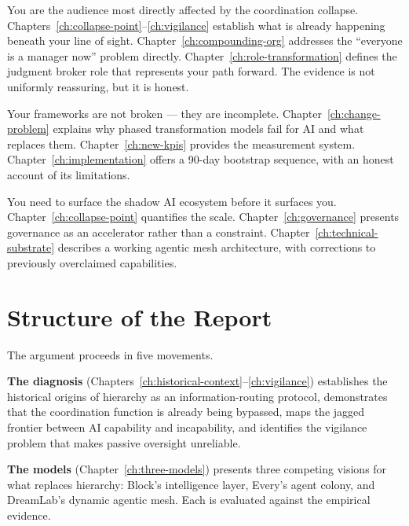 \begin{keyinsight}[title={Who This Report Is For}]
\begin{description}[style=nextline, leftmargin=2em]
  \item[Middle Managers and Team Leaders] You are the audience most directly affected by the coordination collapse. Chapters~\ref{ch:collapse-point}--\ref{ch:vigilance} establish what is already happening beneath your line of sight. Chapter~\ref{ch:compounding-org} addresses the ``everyone is a manager now'' problem directly. Chapter~\ref{ch:role-transformation} defines the judgment broker role that represents your path forward. The evidence is not uniformly reassuring, but it is honest.

  \item[Change Managers and Transformation Leaders] Your frameworks are not broken --- they are incomplete. Chapter~\ref{ch:change-problem} explains why phased transformation models fail for AI and what replaces them. Chapter~\ref{ch:new-kpis} provides the measurement system. Chapter~\ref{ch:implementation} offers a 90-day bootstrap sequence, with an honest account of its limitations.

  \item[AI Strategy Leaders and Chief Technology Officers] You need to surface the shadow AI ecosystem before it surfaces you. Chapter~\ref{ch:collapse-point} quantifies the scale. Chapter~\ref{ch:governance} presents governance as an accelerator rather than a constraint. Chapter~\ref{ch:technical-substrate} describes a working agentic mesh architecture, with corrections to previously overclaimed capabilities.
\end{description}
\end{keyinsight}

\section{Structure of the Report}

The argument proceeds in five movements.

\textbf{The diagnosis} (Chapters~\ref{ch:historical-context}--\ref{ch:vigilance}) establishes the historical origins of hierarchy as an information-routing protocol, demonstrates that the coordination function is already being bypassed, maps the jagged frontier between AI capability and incapability, and identifies the vigilance problem that makes passive oversight unreliable.

\textbf{The models} (Chapter~\ref{ch:three-models}) presents three competing visions for what replaces hierarchy: Block's intelligence layer, Every's agent colony, and DreamLab's dynamic agentic mesh. Each is evaluated against the empirical evidence.


